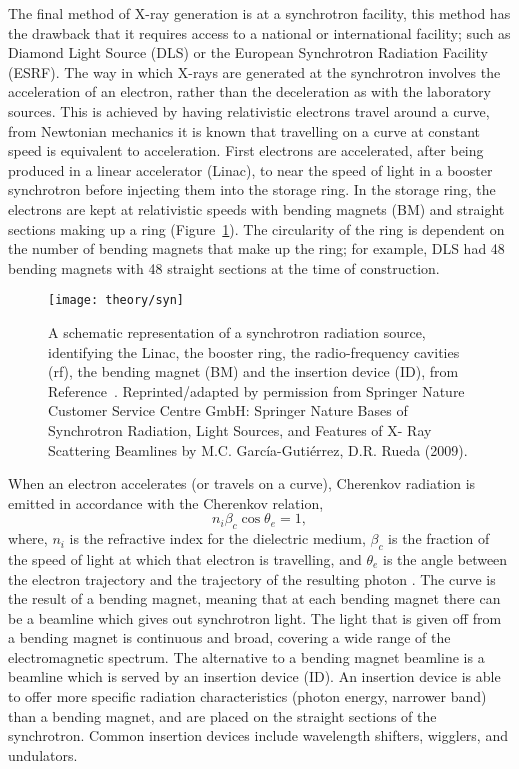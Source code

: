 The final method of X-ray generation is at a synchrotron facility, this method has the drawback that it requires access to a national or international facility; such as Diamond Light Source (DLS) or the European Synchrotron Radiation Facility (ESRF).
The way in which X-rays are generated at the synchrotron involves the acceleration of an electron, rather than the deceleration as with the laboratory sources.
This is achieved by having relativistic electrons travel around a curve, from Newtonian mechanics it is known that travelling on a curve at constant speed is equivalent to acceleration.
First electrons are accelerated, after being produced in a linear accelerator (Linac), to near the speed of light in a booster synchrotron before injecting them into the storage ring.
In the storage ring, the electrons are kept at relativistic speeds with bending magnets (BM) and straight sections making up a ring (Figure~\ref{fig:syn}).
The circularity of the ring is dependent on the number of bending magnets that make up the ring; for example, DLS had 48 bending magnets with 48 straight sections at the time of construction.
%
\begin{figure}
    \centering
    \texttt{[image: theory/syn]}
    \caption{A schematic representation of a synchrotron radiation source, identifying the Linac, the booster ring, the radio-frequency cavities (rf), the bending magnet (BM) and the insertion device (ID), from Reference~\cite{garcia-gutierrez_bases_2009}. Reprinted/adapted by permission from Springer Nature Customer Service Centre GmbH: Springer Nature Bases of Synchrotron Radiation, Light Sources, and Features of X- Ray Scattering Beamlines by M.C. Garc\'{i}a-Guti\'{e}rrez, D.R. Rueda\textsuperscript{\textcopyright} (2009).}
    \label{fig:syn}
\end{figure}
%

When an electron accelerates (or travels on a curve), Cherenkov radiation is emitted in accordance with the Cherenkov relation,
%
\begin{equation}
    n_i\beta_c\cos{\theta_e} = 1,
\end{equation}
%
where, $n_i$ is the refractive index for the dielectric medium, $\beta_c$ is the fraction of the speed of light at which that electron is travelling, and $\theta_e$ is the angle between the electron trajectory and the trajectory of the resulting photon \cite{garcia-gutierrez_bases_2009}.
The curve is the result of a bending magnet, meaning that at each bending magnet there can be a beamline which gives out synchrotron light.
The light that is given off from a bending magnet is continuous and broad, covering a wide range of the electromagnetic spectrum.
The alternative to a bending magnet beamline is a beamline which is served by an insertion device (ID).
An insertion device is able to offer more specific radiation characteristics (photon energy, narrower band) than a bending magnet, and are placed on the straight sections of the synchrotron.
Common insertion devices include wavelength shifters, wigglers, and undulators.

